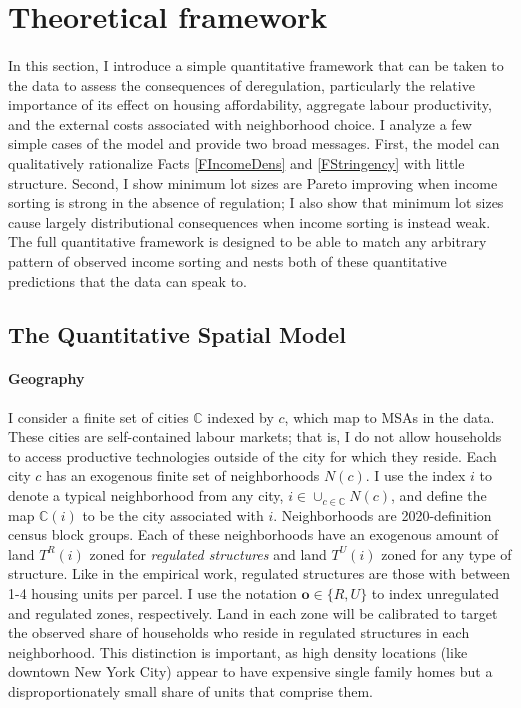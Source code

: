 \documentclass[11pt]{article}
\begin{document}
	
\section{Theoretical framework}\label{Section:Model}
	
	\paragraph*{}
	In this section, I introduce a simple quantitative framework that can be taken to the data to assess the consequences of deregulation, particularly the relative importance of its effect on housing affordability, aggregate labour productivity, and the external costs associated with neighborhood choice. I analyze a few simple cases of the model and provide two broad messages. First, the model can qualitatively rationalize Facts \ref{FIncomeDens} and \ref{FStringency} with little structure. Second, I show minimum lot sizes are Pareto improving when income sorting is strong in the absence of regulation; I also show that minimum lot sizes cause largely distributional consequences when income sorting is instead weak. The full quantitative framework is designed to be able to match any arbitrary pattern of observed income sorting and nests both of these quantitative predictions that the data can speak to.  
	
	\subsection{The Quantitative Spatial Model}
	
	\paragraph*{Geography}
	I consider a finite set of cities $\mathbb{C}$ indexed by $c$, which map to MSAs in the data. These cities are self-contained labour markets; that is, I do not allow households to access productive technologies outside of the city for which they reside. Each city $c$ has an exogenous finite set of neighborhoods $N(c)$. I use the index $i$ to denote a typical neighborhood from any city, $i \in \cup_{c \in \mathbb{C}}N(c)$, and define the map $\mathbb{C}(i)$ to be the city associated with $i$. Neighborhoods are 2020-definition census block groups. Each of these neighborhoods have an exogenous amount of land $T^{R}(i)$ zoned for \textit{regulated structures} and land $T^{U}(i)$ zoned for any type of structure. Like in the empirical work, regulated structures are those with between 1-4 housing units per parcel. I use the notation $\boldsymbol{o} \in \{R, U\}$ to index unregulated and regulated zones, respectively. Land in each zone will be calibrated to target the observed share of households who reside in regulated structures in each neighborhood. This distinction is important, as high density locations (like downtown New York City) appear to have expensive single family homes but a disproportionately small share of units that comprise them.
\end{document}
